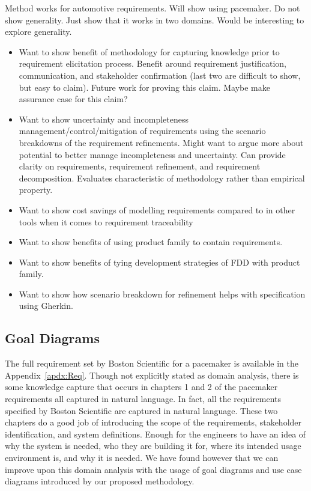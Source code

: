 Method works for automotive requirements. Will show using pacemaker. Do not show generality. Just show that it works in two domains. Would be interesting to explore generality. 

\begin{itemize}
	\item Want to show benefit of methodology for capturing knowledge prior to requirement elicitation process. Benefit around requirement justification, communication, and stakeholder confirmation (last two are difficult to show, but easy to claim). Future work for proving this claim. Maybe make assurance case for this claim?
	\item Want to show uncertainty and incompleteness management/control/mitigation of requirements using the scenario breakdowns of the requirement refinements. Might want to argue more about potential to better manage incompleteness and uncertainty. Can provide clarity on requirements, requirement refinement, and requirement decomposition. Evaluates characteristic of methodology rather than empirical property.
	\item Want to show cost savings of modelling requirements compared to in other tools when it comes to requirement traceability
	\item Want to show benefits of using product family to contain requirements.
	\item Want to show benefits of tying development strategies of FDD with product family.
	\item Want to show how scenario breakdown for refinement helps with specification using Gherkin.
	
\end{itemize}

\subsection{Goal Diagrams}

The full requirement set by Boston Scientific for a pacemaker is available in the Appendix~\ref{apdx:Req}. Though not explicitly stated as domain analysis, there is some knowledge capture that occurs in chapters 1 and 2 of the pacemaker requirements all captured in natural language. In fact, all the requirements specified by Boston Scientific are captured in natural language. These two chapters do a good job of introducing the scope of the requirements, stakeholder identification, and system definitions. Enough for the engineers to have an idea of why the system is needed, who they are building it for, where its intended usage environment is, and why it is needed. We have found however that we can improve upon this domain analysis with the usage of goal diagrams and use case diagrams introduced by our proposed methodology.

